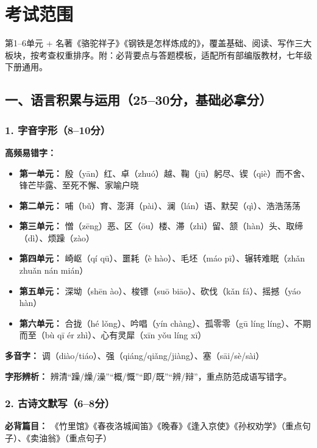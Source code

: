 \chapter{考试范围}


第1--6单元 + 名著《骆驼祥子》《钢铁是怎样炼成的》，覆盖基础、阅读、写作三大板块，按考查权重排序。附：必背要点与答题模板，适配所有部编版教材，七年级下册通用。

\section*{一、语言积累与运用（25--30分，基础必拿分）}

\subsection*{1. 字音字形（8--10分）}

\textbf{高频易错字：}

\begin{itemize}[leftmargin=*]
    \item \textbf{第一单元：} 殷（yān）红、卓（zhuó）越、鞠（jū）躬尽、锲（qiè）而不舍、锋芒毕露、至死不懈、家喻户晓
    \item \textbf{第二单元：} 哺（bǔ）育、澎湃（pài）、澜（lán）语、默契（qì）、浩浩荡荡
    \item \textbf{第三单元：} 憎（zēng）恶、区（ōu）楼、滞（zhì）留、颔（hàn）头、取缔（dì）、烦躁（zào）
    \item \textbf{第四单元：} 崎岖（qí qū）、噩耗（è hào）、毛坯（máo pī）、辗转难眠（zhǎn zhuǎn nán mián）
    \item \textbf{第五单元：} 深坳（shēn ào）、梭镖（suō biāo）、砍伐（kǎn fá）、摇撼（yáo hàn）
    \item \textbf{第六单元：} 合拢（hé lǒng）、吟唱（yín chàng）、孤零零（gū líng líng）、不期而至（bù qī ér zhì）、心有灵犀（xīn yǒu líng xī）
\end{itemize}

\textbf{多音字：} 调（diào/tiáo）、强（qiáng/qiǎng/jiàng）、塞（sāi/sè/sài）

\textbf{字形辨析：} 辨清“躁/燥/澡”“概/慨”“即/既”“辨/辩”，重点防范成语写错字。

\subsection*{2. 古诗文默写（6--8分）}

\textbf{必背篇目：} 《竹里馆》《春夜洛城闻笛》《晚春》《逢入京使》《孙权劝学》（重点句子）、《卖油翁》（重点句子）

